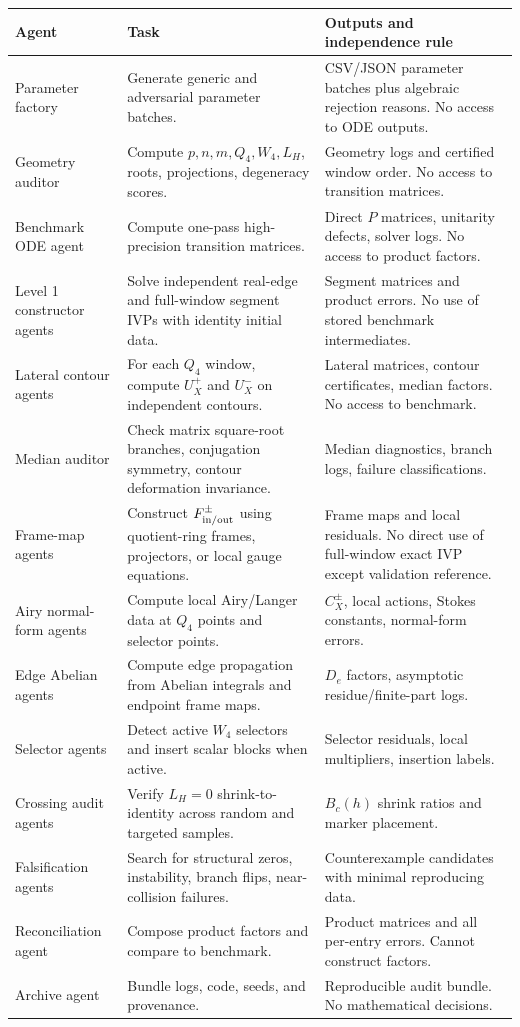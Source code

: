 \documentclass[11pt]{article}
\begin{document}
\begin{longtable}{P{0.20\textwidth}P{0.32\textwidth}P{0.38\textwidth}}
\toprule
\textbf{Agent} & \textbf{Task} & \textbf{Outputs and independence rule}\\
\midrule
Parameter factory & Generate generic and adversarial parameter batches. & CSV/JSON parameter batches plus algebraic rejection reasons. No access to ODE outputs.\\
Geometry auditor & Compute $p,n,m,Q_4,W_4,L_H$, roots, projections, degeneracy scores. & Geometry logs and certified window order. No access to transition matrices.\\
Benchmark ODE agent & Compute one-pass high-precision transition matrices. & Direct $P$ matrices, unitarity defects, solver logs. No access to product factors.\\
Level 1 constructor agents & Solve independent real-edge and full-window segment IVPs with identity initial data. & Segment matrices and product errors. No use of stored benchmark intermediates.\\
Lateral contour agents & For each $Q_4$ window, compute $U_X^+$ and $U_X^-$ on independent contours. & Lateral matrices, contour certificates, median factors. No access to benchmark.\\
Median auditor & Check matrix square-root branches, conjugation symmetry, contour deformation invariance. & Median diagnostics, branch logs, failure classifications.\\
Frame-map agents & Construct $F_{\rm in/out}^\pm$ using quotient-ring frames, projectors, or local gauge equations. & Frame maps and local residuals. No direct use of full-window exact IVP except validation reference.\\
Airy normal-form agents & Compute local Airy/Langer data at $Q_4$ points and selector points. & $C_X^\pm$, local actions, Stokes constants, normal-form errors.\\
Edge Abelian agents & Compute edge propagation from Abelian integrals and endpoint frame maps. & $D_e$ factors, asymptotic residue/finite-part logs.\\
Selector agents & Detect active $W_4$ selectors and insert scalar blocks when active. & Selector residuals, local multipliers, insertion labels.\\
Crossing audit agents & Verify $L_H=0$ shrink-to-identity across random and targeted samples. & $B_c(h)$ shrink ratios and marker placement.\\
Falsification agents & Search for structural zeros, instability, branch flips, near-collision failures. & Counterexample candidates with minimal reproducing data.\\
Reconciliation agent & Compose product factors and compare to benchmark. & Product matrices and all per-entry errors. Cannot construct factors.\\
Archive agent & Bundle logs, code, seeds, and provenance. & Reproducible audit bundle. No mathematical decisions.\\
\bottomrule
\end{longtable}
\end{document}
